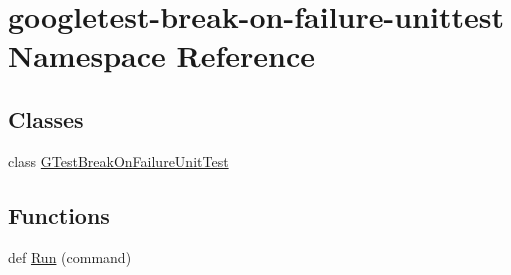 \hypertarget{namespacegoogletest-break-on-failure-unittest}{}\section{googletest-\/break-\/on-\/failure-\/unittest Namespace Reference}
\label{namespacegoogletest-break-on-failure-unittest}
\subsection*{Classes}
\begin{DoxyCompactItemize}
\item 
class \mbox{\hyperlink{classgoogletest-break-on-failure-unittest_1_1_g_test_break_on_failure_unit_test}{G\+Test\+Break\+On\+Failure\+Unit\+Test}}
\end{DoxyCompactItemize}
\subsection*{Functions}
\begin{DoxyCompactItemize}
\item 
def \mbox{\hyperlink{namespacegoogletest-break-on-failure-unittest_a1af5bbcd251e90355ddcd17d0e0e6147}{Run}} (command)
\end{DoxyCompactItemize}
